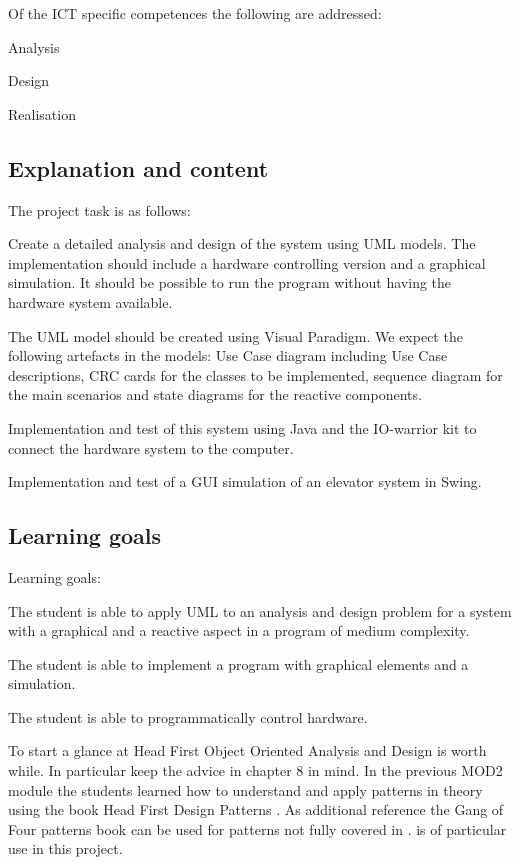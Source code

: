 Of the ICT specific competences the following are addressed:
\begin{Itemize}
\item Analysis
\item Design
\item Realisation
\end{Itemize}


\subsection{Explanation and  content}
The project task is as follows:
\begin{Enumerate}
\item Create a detailed analysis and design of the system using
  UML models. The implementation should include a hardware controlling version
  and a graphical simulation. It should be possible to run the program
  without having the hardware system available.
\item The UML model should be created using Visual Paradigm. We
  expect the following artefacts in the models: Use Case diagram
  including Use Case descriptions, CRC cards for the classes to be
  implemented, sequence diagram for the main scenarios and state
  diagrams for the reactive components.
\item Implementation and test of this system using Java and the
  IO-warrior kit to connect the hardware system to the computer.
\item Implementation and test of a GUI simulation of an elevator
  system in Swing.
\end{Enumerate}


\subsection{Learning goals}
Learning goals:

The student is able to apply UML to an analysis and design problem for
a  system with a graphical and a reactive aspect in a program of
medium complexity.

The student is able to implement a program with graphical elements and
a simulation.

The student is able to programmatically control hardware. 

To start a glance at Head First Object Oriented Analysis and Design
\cite{HFOOAD} is worth while. In particular keep the advice in chapter
8 in mind.
In the previous MOD2 module the students learned how to understand and
apply patterns in theory using the book Head First Design Patterns \cite{HFDP}.
As additional reference the Gang of Four patterns book \cite{GOF} can
be used for patterns not fully covered in \cite{HFDP}. 
is of particular use in this project.

